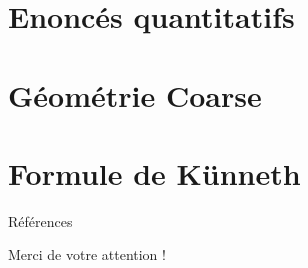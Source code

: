 \documentclass{beamer}
\begin{document}
\section{Enoncés quantitatifs}
\begin{frame}
  \tableofcontents[currentsection]
\end{frame}


\section{Géométrie Coarse}
\begin{frame}
  \tableofcontents[currentsection]
\end{frame}


\section{Formule de Künneth}
\begin{frame}
  \tableofcontents[currentsection]
\end{frame}


\footnotesize
\begin{frame}{Références}


\end{frame} 

\Large
\begin{frame}{}
Merci de votre attention !
\end{frame}
\end{document}
